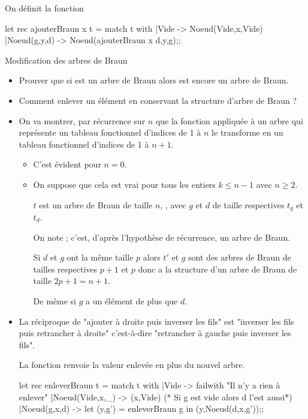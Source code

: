 On définit la fonction 
\begin{ocaml}
let rec ajouterBraun x t =
  match t with
  |Vide -> Noeud(Vide,x,Vide)
  |Noeud(g,y,d) -> Noeud(ajouterBraun x d,y,g);;
\end{ocaml}
\begin{exo}{Modification des arbres de Braun}{}
\begin{itemize}
\item Prouver que si  est un arbre de Braun alors  est encore un arbre de Braun.
\item Comment enlever un élément en conservant la structure d'arbre de Braun ? 
\end{itemize}
\reponse
\begin{itemize}
\item On va montrer, par récurrence sur $n$ que la fonction  appliquée à un arbre qui représente un tableau fonctionnel d'indices de 1 à $n$ le transforme en un tableau fonctionnel d'indices de 1 à $n+1$.

\begin{itemize}
\item C'est évident pour $n=0$.
\item On suppose que cela est vrai pour tous les entiers $k\le n-1$ avec $n \ge 2$.

$t$ est un arbre de Braun de taille $n$, , avec $g$ et $d$ de taille respectives $t_g$ et $t_d$.  

On note  ; c'est, d'après l'hypothèse de récurrence, un arbre de Braun.

Si $d$ et $g$ ont la même taille $p$ alors $t'$ et $g$ sont des arbres de Braun de tailles respectives $p+1$ et $p$ donc  a la structure d'un arbre de Braun de taille $2p+1=n+1$.

De même si $g$ a un élément de plus que $d$.
\end{itemize}

\item La réciproque de "ajouter à droite puis inverser les fils" est "inverser les fils puis retrancher à droite" c'est-à-dire  "retrancher à gauche puis inverser les fils".

 La fonction renvoie la valeur enlevée en plus du nouvel arbre.

\begin{ocaml}[numbers=left]
let rec enleverBraun t =
  match t with
  |Vide -> failwith "Il n'y a rien à enlever"
  |Noeud(Vide,x,_) -> (x,Vide) (* Si g est vide alors d l'est aussi*)
  |Noeud(g,x,d) -> let (y,g') = enleverBraun g in
                   (y,Noeud(d,x,g'));;
\end{ocaml}
\end{itemize}
\end{exo}
